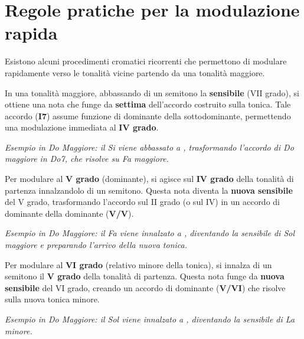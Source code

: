 \section{Regole pratiche per la modulazione rapida}
\label{sec:regole_pratiche_modulazione}

Esistono alcuni procedimenti cromatici ricorrenti che permettono di modulare rapidamente verso le tonalità vicine partendo da una tonalità maggiore.

\begin{regola}
	\label{reg:mod_iv_sensibile_abbassata}
	In una tonalità maggiore, abbassando di un semitono la \textbf{sensibile} (VII grado), si ottiene una nota che funge da \textbf{settima} dell'accordo costruito sulla tonica. Tale accordo (\textbf{I7}) assume funzione di dominante della sottodominante, permettendo una modulazione immediata al \textbf{IV grado}.
	
	\textit{Esempio in Do Maggiore: il Si viene abbassato a \Sibemolle , trasformando l'accordo di Do maggiore in Do7, che risolve su Fa maggiore.}
\end{regola}

\begin{regola}
	\label{reg:mod_v_quarto_innalzato}
	Per modulare al \textbf{V grado} (dominante), si agisce sul \textbf{IV grado} della tonalità di partenza innalzandolo di un semitono. Questa nota diventa la \textbf{nuova sensibile} del V grado, trasformando l'accordo sul II grado (o sul IV) in un accordo di dominante della dominante (\textbf{V/V}).
	
	\textit{Esempio in Do Maggiore: il Fa viene innalzato a \Fadiesis , diventando la sensibile di Sol maggiore e preparando l'arrivo della nuova tonica.}
\end{regola}

\begin{regola}
	\label{reg:mod_vi_quinto_innalzato}
	Per modulare al \textbf{VI grado} (relativo minore della tonica), si innalza di un semitono il \textbf{V grado} della tonalità di partenza. Questa nota funge da \textbf{nuova sensibile} del VI grado, creando un accordo di dominante (\textbf{V/VI}) che risolve sulla nuova tonica minore.
	
	\textit{Esempio in Do Maggiore: il Sol viene innalzato a \Soldiesis , diventando la sensibile di La minore.}
\end{regola}

